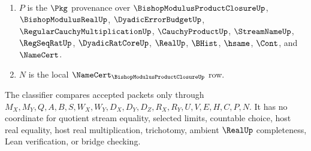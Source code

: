\begin{definition}
\begin{enumerate}
\item $P$ is the $\Pkg$ provenance over $\BishopModulusProductClosureUp$, $\BishopModulusRealUp$, $\DyadicErrorBudgetUp$, $\RegularCauchyMultiplicationUp$, $\CauchyProductUp$, $\StreamNameUp$, $\RegSeqRatUp$, $\DyadicRatCoreUp$, $\RealUp$, $\BHist$, $\hsame$, $\Cont$, and $\NameCert$.
\item $N$ is the local $\NameCert_{\BishopModulusProductClosureUp}$ row.
\end{enumerate}
The classifier compares accepted packets only through $M_X,M_Y,Q,A,B,S,W_X,W_Y,D_X,D_Y,D_Z,R_X,R_Y,U,V,E,H,C,P,N$. It has no coordinate for quotient stream equality, selected limits, countable choice, host real equality, host real multiplication, trichotomy, ambient $\RealUp$ completeness, Lean verification, or bridge checking.
\end{definition}

